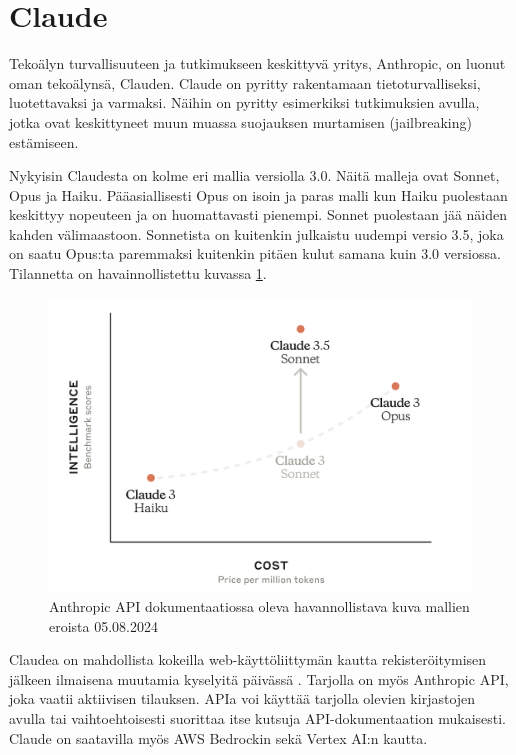 \section{Claude}

Tekoälyn turvallisuuteen ja tutkimukseen keskittyvä yritys, Anthropic, on
luonut oman tekoälynsä, Clauden. Claude on pyritty rakentamaan
tietoturvalliseksi, luotettavaksi ja varmaksi. \parencite{anthropicCompany}
\parencite{anthropicClaude} Näihin on pyritty esimerkiksi tutkimuksien avulla,
jotka ovat keskittyneet muun muassa suojauksen murtamisen (jailbreaking)
estämiseen. \parencite{anthropicResearch}

Nykyisin Claudesta on kolme eri mallia versiolla 3.0. Näitä malleja ovat
Sonnet, Opus ja Haiku. Pääasiallisesti Opus on isoin ja paras malli kun Haiku
puolestaan keskittyy nopeuteen ja on huomattavasti pienempi. Sonnet puolestaan
jää näiden kahden välimaastoon. Sonnetista on kuitenkin julkaistu uudempi
versio 3.5, joka on saatu Opus:ta paremmaksi kuitenkin pitäen kulut samana kuin
3.0 versiossa. Tilannetta on havainnollistettu kuvassa
\ref{fig:3-5-sonnet-curve}. \parencite{anthropicAPIDocsModels}

\begin{figure}[H]
  \includegraphics[width=\textwidth]{figures/3-5-sonnet-curve.png}
  \caption{Anthropic API dokumentaatiossa oleva havannollistava kuva mallien eroista 05.08.2024}
  \label{fig:3-5-sonnet-curve}
\end{figure}

Claudea on mahdollista kokeilla web-käyttöliittymän kautta rekisteröitymisen
jälkeen ilmaisena muutamia kyselyitä päivässä \parencite{claudeChat}. Tarjolla
on myös Anthropic API, joka vaatii aktiivisen tilauksen. APIa voi käyttää
tarjolla olevien kirjastojen avulla tai vaihtoehtoisesti suorittaa itse kutsuja
API-dokumentaation mukaisesti. Claude on saatavilla myös AWS Bedrockin sekä
Vertex AI:n kautta. \parencite{anthropicAPIDocs}

